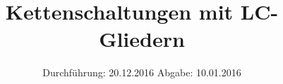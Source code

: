 

\subject{V356}
\title{Kettenschaltungen mit LC-Gliedern}
\date{
\centering
  Durchführung: 20.12.2016
  \hspace{3em}
  Abgabe: 10.01.2016
}



\maketitle
\thispagestyle{empty}
\tableofcontents
\newpage








\printbibliography


